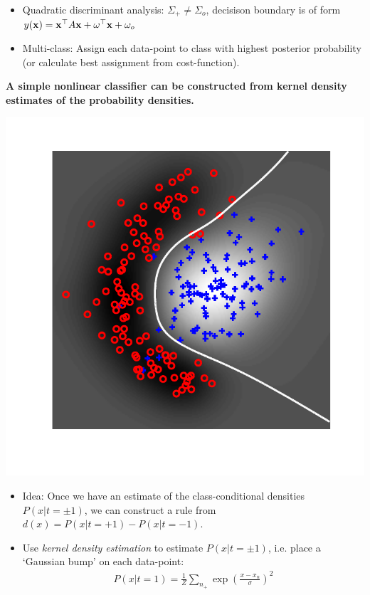 \begin{itemize}
\item Quadratic discriminant analysis: $\Sigma_+ \neq \Sigma_o$, decisison boundary is of form $y({\mathbf{x}}) = {\mathbf{x}}^\top A {\mathbf{x}}+\omega^\top {\mathbf{x}} +\omega_o$
\item Multi-class: Assign each data-point to class with highest posterior probability (or calculate best assignment from cost-function). 
\end{itemize}

\textbf{A simple nonlinear classifier can be constructed from kernel density estimates of the probability densities.}

\includegraphics[width=\textwidth]{./lecture6/NonLinClassification.pdf}
\begin{itemize}
	\item Idea: Once we have an estimate of the class-conditional densities $P(x| t=\pm 1)$, we can construct a rule from $d(x)=P(x| t=+ 1)-P(x| t=- 1)$.
	\item  Use \emph{kernel density estimation} to estimate  $P(x| t=\pm 1)$, i.e. place a `Gaussian bump' on each data-point:
	\begin{align}
		P(x| t=1) =\frac{1}{Z}\sum_{n_+} \exp\left( \frac{x-x_n}{\sigma}\right)^2
	\end{align}
\end{itemize}

